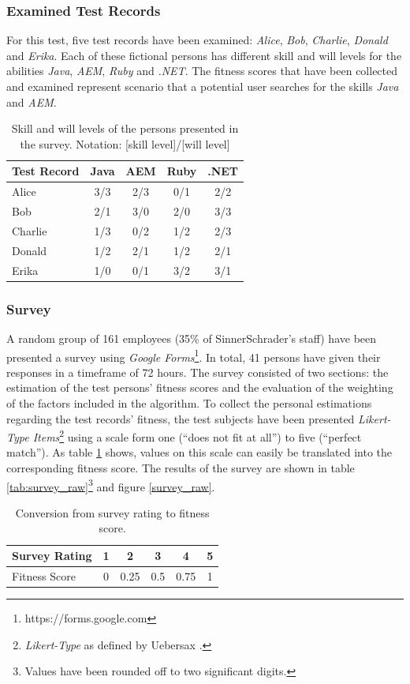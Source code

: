 \subsubsection{Examined Test Records}
For this test, five test records have been examined: \textit{Alice}, \textit{Bob}, \textit{Charlie}, \textit{Donald} and \textit{Erika}. Each of these fictional persons has different skill and will levels for the abilities \textit{Java}, \textit{AEM}, \textit{Ruby} and \textit{.NET}. The fitness scores that have been collected and examined represent scenario that a potential user searches for the skills \textit{Java} and \textit{AEM}.
\begin{table}[H]
\centering
  \begin{tabular}{l||c|c|c|c}
		Test Record  & Java & AEM & Ruby & .NET\\
		\hline
		Alice   & 3/3   & 2/3  & 0/1   & 2/2 \\
		Bob     & 2/1   & 3/0  & 2/0   & 3/3 \\
		Charlie & 1/3   & 0/2  & 1/2   & 2/3 \\
		Donald  & 1/2   & 2/1  & 1/2   & 2/1 \\
		Erika   & 1/0   & 0/1  & 3/2   & 3/1 \\
  \end{tabular}
\caption[Survey: Test Record Overview]{Skill and will levels of the persons presented in the survey. Notation: [skill level]/[will level]}
\end{table}
\subsubsection{Survey}
A random group of 161 employees (35\% of SinnerSchrader's staff) have been presented a survey using \textit{Google Forms}\footnote{https://forms.google.com}.
In total, 41 persons have given their responses in a timeframe of 72 hours.
The survey consisted of two sections: the estimation of the test persons' fitness scores and the evaluation of the weighting of the factors included in the algorithm. To collect the personal estimations regarding the test records' fitness, the test subjects have been presented
\textit{Likert-Type Items}\footnote{\textit{Likert-Type} as defined by Uebersax \cite{likerttype}.} using a scale form one (``does not fit at all'') to five (``perfect match''). As table \ref{tab:scoretrans} shows, values on this scale can easily be translated into the corresponding fitness score. The results of the survey are shown in table \ref{tab:survey_raw}\footnote{Values have been rounded off to two significant digits.} and figure \ref{survey_raw}.
\begin{table}[H]
\centering
\begin{tabular}{l||c|c|c|c|c}
	Survey Rating & 1 & 2    & 3   & 4    & 5\\
	\hline
	Fitness Score & 0 & 0.25 & 0.5 & 0.75 & 1\\
\end{tabular}
\caption[Survey: Rating to Fitness Score]{Conversion from survey rating to fitness score.}
\label{tab:scoretrans}
\end{table}


